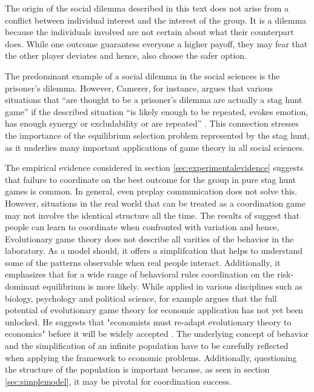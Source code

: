 
The origin of the social dilemma described in this text does not arise
from a conflict between individual interest and the interest of the group.
It is a dilemma because the individuals involved are not certain about
what their counterpart does. While one outcome guarantess everyone a higher 
payoff, they may fear that the other player deviates and hence, also choose 
the safer option. 

The predominant example of a social dilemma in the 
social sciences is the prisoner's dilemma. However, 
Camerer, for instance, argues that various situations that 
``are thought to be a prisoner's 
dilemma are actually a stag hunt game'' 
if the described situation ``is likely enough to be repeated, evokes emotion, 
has enough synergy or excludability or are repeated'' 
\parencite[376-377]{camerer_behavioral_2003}. 
This connection stresses the importance of the equilibrium selection problem
represented by the stag hunt, as it underlies many important 
applications of game theory in all social sciences. 

The empirical evidence considered in section \ref{sec:experimentalevidence}
suggests that failure to coordinate on the best outcome for the group
in pure stag hunt games is common. 
In general, even preplay communication does not solve this.
However, situations in the real world that can be treated as a coordination
game may not involve the identical structure all the time. The
results of \textcite{rankin_strategic_2000} suggest that people can learn 
to coordinate when confronted with variation and hence,  
Evolutionary game theory does not describe all varities of the 
behavior in the laboratory. As a model should, it offers a simplifcation
that helps to understand some of the patterns observable when real people
interact. Additionally, it emphasizes that for a wide range
of behavioral rules coordination on the risk-dominant equilibrium
is more likely. While applied in various disciplines such as biology, 
psychology and political science, for example 
\textcite{friedman_economic_1998} argues that the full potential
of evolutionary game theory for economic application 
has not yet been unlocked. He suggests that "economists must re-adapt
evolutionary theory to economics" before it will be widely accepted 
\parencite[18]{friedman_economic_1998}. The underlying concept of behavior and
the simplification of an infinite population have to be carefully reflected
when applying the framework to economic problems. Additionally, questioning
the structure of the population is important because, as seen in section
\ref{sec:simplemodel}, it may be pivotal for coordination success.
